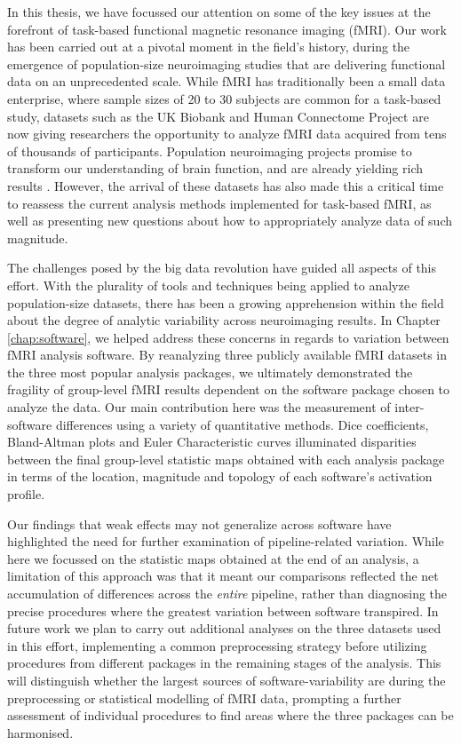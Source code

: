 In this thesis, we have focussed our attention on some of the key issues at the forefront of task-based functional magnetic resonance imaging (fMRI). Our work has been carried out at a pivotal moment in the field's history, during the emergence of population-size neuroimaging studies that are delivering functional data on an unprecedented scale. While fMRI has traditionally been a small data enterprise, where sample sizes of 20 to 30 subjects are common for a task-based study, datasets such as the UK Biobank and Human Connectome Project are now giving researchers the opportunity to analyze fMRI data acquired from tens of thousands of participants. Population neuroimaging projects promise to transform our understanding of brain function, and are already yielding rich results \citep{Miller2016-hd, David_C_Van_Essen2016-bt}. However, the arrival of these datasets has also made this a critical time to reassess the current analysis methods implemented for task-based fMRI, as well as presenting new questions about how to appropriately analyze data of such magnitude.

The challenges posed by the big data revolution have guided all aspects of this effort. With the plurality of tools and techniques being applied to analyze population-size datasets, there has been a growing apprehension within the field about the degree of analytic variability across neuroimaging results. In Chapter \ref{chap:software}, we helped address these concerns in regards to variation between fMRI analysis software. By reanalyzing three publicly available fMRI datasets in the three most popular analysis packages, we ultimately demonstrated the fragility of group-level fMRI results dependent on the software package chosen to analyze the data. Our main contribution here was the measurement of inter-software differences using a variety of quantitative methods. Dice coefficients, Bland-Altman plots and Euler Characteristic curves illuminated disparities between the final group-level statistic maps obtained with each analysis package in terms of the location, magnitude and topology of each software's activation profile. 

Our findings that weak effects may not generalize across software have highlighted the need for further examination of pipeline-related variation. While here we focussed on the statistic maps obtained at the end of an analysis, a limitation of this approach was that it meant our comparisons reflected the net accumulation of differences across the \textit{entire} pipeline, rather than diagnosing the precise procedures where the greatest variation between software transpired. In future work we plan to carry out additional analyses on the three datasets used in this effort, implementing a common preprocessing strategy before utilizing procedures from different packages in the remaining stages of the analysis. This will distinguish whether the largest sources of software-variability are during the preprocessing or statistical modelling of fMRI data, prompting a further assessment of individual procedures to find areas where the three packages can be harmonised. 


